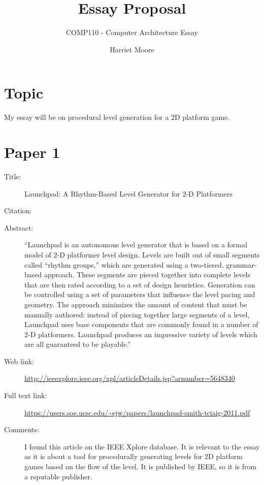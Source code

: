 \documentclass{scrartcl}
\title{Essay Proposal}
\subtitle{COMP110 - Computer Architecture Essay}
\author{Harriet Moore}
\begin{document}
\maketitle

\section*{Topic}

My essay will be on procedural level generation for a 2D platform game.

\section*{Paper 1}
\begin{description}
\item[Title:] Launchpad: A Rhythm-Based Level Generator for 2-D Platformers
\item[Citation:] \cite{smith:launchpad}
\item[Abstract:] ``Launchpad is an autonomous level generator that is based on a formal model of 2-D platformer level design. Levels are built out of small segments called “rhythm groups,” which are generated using a two-tiered, grammar-based approach. These segments are pieced together into complete levels that are then rated according to a set of design heuristics. Generation can be controlled using a set of parameters that influence the level pacing and geometry. The approach minimizes the amount of content that must be manually authored: instead of piecing together large segments of a level, Launchpad uses base components that are commonly found in a number of 2-D platformers. Launchpad produces an impressive variety of levels which are all guaranteed to be playable.''
\item[Web link:] \url{http://ieeexplore.ieee.org/xpl/articleDetails.jsp?arnumber=5648340}
\item[Full text link:] \url{https://users.soe.ucsc.edu/~ejw/papers/launchpad-smith-tciaig-2011.pdf}
\item[Comments:] I found this article on the IEEE Xplore database. It is relevant to the essay as it is about a tool for procedurally generating levels for 2D platform games based on the flow of the level. It is published by IEEE, so it is from a reputable publisher.
\end{description}
\end{document}
